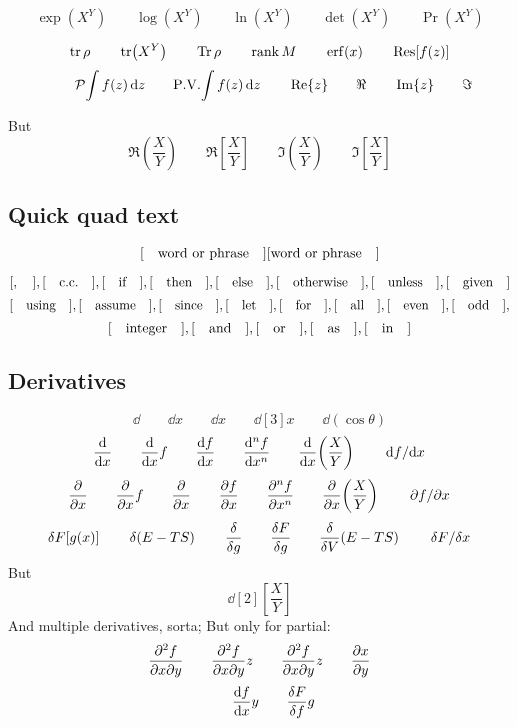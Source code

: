 \documentclass{article}
\newcommand{\tall}{X^Y}
\newcommand{\grande}{\frac{X}{Y}}
\begin{document}

\[
  \exp(\tall)
\qquad \log(\tall)
\qquad\ln(\tall) 
\qquad \det(\tall)
\qquad \Pr(\tall)
\]


\[
 \tr\rho
\qquad \tr(\tall)
\qquad \Tr\rho
\qquad \rank M
\qquad \erf(x)
\qquad \Res[f(z)]
\]
\[
\qquad \pv{\int f(z) \dd{z}}
\qquad \PV{\int f(z) \dd{z}}
\qquad \Re{z}
\qquad \real
\qquad \Im{z}
\qquad \imaginary
\]

But
  \[ \Re(\grande)
    \qquad \Re[\grande]
    \qquad \Im(\grande)
    \qquad \Im[\grande]
\]

\subsection{Quick quad text}
\[
[\qq{word or phrase}]
[\qq*{word or phrase}]
\]

\[
  [\qcomma], [\qcc], [\qif],[\qthen], [\qelse], [\qotherwise], [\qunless], [\qgiven]
\]
\[
  [\qusing],[\qassume], [\qsince], [\qlet], [\qfor], [\qall], [\qeven], [\qodd],
\]
\[
  [\qinteger], [\qand], [\qor], [\qas], [\qin]
\]

\subsection{Derivatives}

\[
 \dd
   \qquad \dd x
   \qquad\dd{x}
   \qquad \dd[3]{x}
   \qquad \dd(\cos\theta)
\]
\[
 \dv{x}
 \qquad \dv{x} f
   \qquad \dv{f}{x}
   \qquad \dv[n]{f}{x}
   \qquad \dv{x}(\grande)
   \qquad \dv*{f}{x}
\]
\[
 \pderivative{x}
   \qquad \pderivative{x} f
   \qquad \pdv{x}
   \qquad \pdv{f}{x}
   \qquad \pdv[n]{f}{x}
   \qquad \pdv{x}(\grande)
   \qquad \pdv*{f}{x}
\]
 \[
 \var{F[g(x)]}
   \qquad \var(E-TS)
   \qquad \fdv{g}
   \qquad \fdv{F}{g}
   \qquad \fdv{V}(E-TS)
   \qquad \fdv*{F}{x}
\]
But
 \[
 \dd[2][\grande]
\]
And multiple derivatives, sorta; But only for partial:
\[
   \pdv{f}{x}{y}
   \qquad \pdv{f}{x}{y}{z}
   \qquad \pdv[3]{f}{x}{y}{z}
   \qquad \pdv{x}{y}(f)
 \]
\[
   \qquad \dv{f}{x}{y}
   \qquad \fdv{F}{f}{g}
\]
\end{document}
